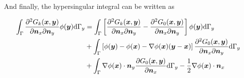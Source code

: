 \documentclass[a4paper, 10pt]{article}
\newcommand{\td}{\mathrm{d}}
\newcommand{\sx}{\bm{\mathnormal{x}}}
\newcommand{\sy}{\bm{\mathnormal{y}}}
\newcommand{\sn}{\bm{\mathnormal{n}}}
\begin{document}
And finally, the hypersingular integral can be written as

\begin{align}
	\int_\Gamma \frac{\partial^2 G_k(\sx, \sy)}{\partial \sn_x \partial \sn_y} \phi(\sy) \td \Gamma_y & = \int_\Gamma \left[\frac{\partial^2 G_k(\sx, \sy)}{\partial \sn_x \partial \sn_y} - \frac{\partial^2 G_0(\sx, \sy)}{\partial \sn_x \partial \sn_y}\right] \phi(\sy) \td \Gamma_y \nonumber \\
	& + \int_\Gamma \left[\phi(\sy) - \phi(\sx) - \nabla \phi(\sx) (\sy - \sx) \right] \frac{\partial^2 G_0(\sx, \sy)}{\partial \sn_x \partial \sn_y} \td \Gamma_y \nonumber \\
	& + \int_\Gamma \nabla \phi(\sx) \cdot \sn_y \frac{\partial G_0(\sx,\sy)}{\partial \sn_x} \td \Gamma_y -\frac{1}{2} \nabla \phi(\sx) \cdot \sn_x
\end{align}
\end{document}
